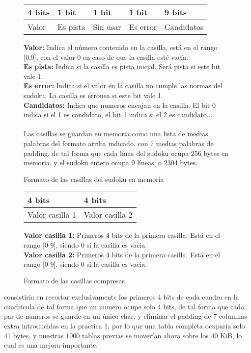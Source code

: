 \documentclass[12pt,letterpaper]{article}
\begin{document}
\begin{figure}
  \begin{center}
    \begin{tabular}{ | p{2cm} | p{2cm} | p{2cm} | p{2cm} | p{4cm} |} \hline
      4 bits & 1 bit    & 1 bit    & 1 bit    & 9 bits     \\\hline
      Valor  & Es pista & Sin usar & Es error & Candidatos \\\hline
    \end{tabular}
  \end{center}
  \textbf{Valor:} Indica el número contenido en la casilla, está en el
  rango [0,9], con el valor 0 en caso de que la casilla esté vacía.\\
  \textbf{Es pista:} Indica si la casilla es pista inicial. Será pista
  si este bit vale 1.\\
  \textbf{Es error:} Indica si el valor en la casilla no cumple las
  normas del sudoku. La casilla es erronea si este bit vale 1.\\
  \textbf{Candidatos:} Indica que numeros encajan en la casilla. El
  bit 0 indica si el 1 es candidato, el bit 1 indica si el 2 es
  candidato...\\ \\

  Las casillas se guardan en memoria como una lista de medias palabras
  del formato arriba indicado, con 7 medias palabras de padding, de
  tal forma que cada línea del sudoku ocupa 256 bytes en memoria, y el
  sudoku entero ocupa 9 líneas, o 2304 bytes.
  \caption{Formato de las casillas del sudoku en memoria}
  \label{fig:formato-casilla}
\end{figure}

\begin{figure}
  \begin{center}
    \begin{tabular}{ | p{4cm} | p{4cm} | } \hline
      4 bits           & 4 bits          \\\hline
      Valor casilla 1  & Valor casilla 2 \\\hline
    \end{tabular}
  \end{center}
  \textbf{Valor casilla 1:} Primeros 4 bits de la primera casilla. Está en el rango [0-9], siendo 0 si la casilla es vacia.\\
  \textbf{Valor casilla 2:} Primeros 4 bits de la primera casilla. Está en el rango [0-9], siendo 0 si la casilla es vacia.
  \caption{Formato de las casillas compresas}
  \label{fig:formato-casilla-compreso}
\end{figure}

consistiría en recortar exclusivamente los primeros 4 bits de cada
cuadro en la cuadricula de tal forma que un numero ocupe solo 4 bits,
de tal forma que cada par de numeros se guarde en un único char, y
eliminar el padding de 7 columnas extra introducidas en la practica 1,
por lo que una tabla completa ocuparía solo 41 bytes, y nuestras 1000
tablas previas se moverían ahora sobre los 40 KiB, lo cual es una
mejora importante.
\end{document}

